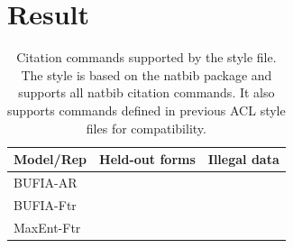 \documentclass[11pt]{article}
\begin{document}
\section{Result}
\begin{table}
  \centering
  \begin{tabular}{lll}
    \hline
    \textbf{Model/Rep}           & \textbf{Held-out forms} & \textbf{Illegal data} \\
    \hline
    BUFIA-AR       &            &                           \\
    BUFIA-Ftr     &          &                           \\
    MaxEnt-Ftr       &           &                           \\

    \hline
  \end{tabular}
  \caption{\label{citation-guide}
    Citation commands supported by the style file.
    The style is based on the natbib package and supports all natbib citation commands.
    It also supports commands defined in previous ACL style files for compatibility.
  }
\end{table}


%

\end{document}
